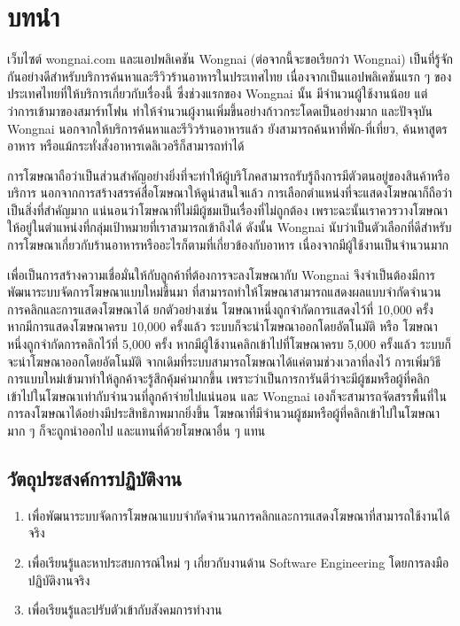 \chapter{บทนำ}
\label{chapter:introduction}

เว็บไซต์ wongnai.com และแอปพลิเคชัน Wongnai (ต่อจากนี้จะขอเรียกว่า Wongnai) เป็นที่รู้จักกันอย่างดีสำหรับบริการค้นหาและรีวิวร้านอาหารในประเทศไทย เนื่องจากเป็นแอปพลิเคชันแรก ๆ ของประเทศไทยที่ให้บริการเกี่ยวกับเรื่องนี้ ซึ่งช่วงแรกของ Wongnai นั้น มีจำนวนผู้ใช้งานน้อย แต่ว่าการเข้ามาของสมาร์ทโฟน ทำให้จำนวนผู้งานเพิ่มขึ้นอย่างก้าวกระโดดเป็นอย่างมาก และปัจจุบัน Wongnai นอกจากให้บริการค้นหาและรีวิวร้านอาหารแล้ว ยังสามารถค้นหาที่พัก-ที่เที่ยว, ค้นหาสูตรอาหาร หรือแม้กระทั่งสั่งอาหารเดลิเวอรีก็สามารถทำได้

การโฆษณาถือว่าเป็นส่วนสำคัญอย่างยิ่งที่จะทำให้ผู้บริโภคสามารถรับรู้ถึงการมีตัวตนอยู่ของสินค้าหรือบริการ นอกจากการสร้างสรรค์สื่อโฆษณาให้ดูน่าสนใจแล้ว การเลือกตำแหน่งที่จะแสดงโฆษณาก็ถือว่าเป็นสิ่งที่สำคัญมาก แน่นอนว่าโฆษณาที่ไม่มีผู้ชมเป็นเรื่องที่ไม่ถูกต้อง เพราะฉะนั้นเราควรวางโฆษณาให้อยู่ในตำแหน่งที่กลุ่มเป้าหมายที่เราสามารถเข้าถึงได้ ดังนั้น Wongnai นับว่าเป็นตัวเลือกที่ดีสำหรับการโฆษณาเกี่ยวกับร้านอาหารหรืออะไรก็ตามที่เกี่ยวข้องกับอาหาร เนื่องจากมีผู้ใช้งานเป็นจำนวนมาก

เพื่อเป็นการสร้างความเชื่อมั่นให้กับลูกค้าที่ต้องการจะลงโฆษณากับ Wongnai จึงจำเป็นต้องมีการพัฒนาระบบจัดการโฆษณาแบบใหม่ขึ้นมา ที่สามารถทำให้โฆษณาสามารถแสดงผลแบบจำกัดจำนวนการคลิกและการแสดงโฆษณาได้ ยกตัวอย่างเช่น โฆษณาหนึ่งถูกจำกัดการแสดงไว้ที่ 10,000 ครั้ง หากมีการแสดงโฆษณาครบ 10,000 ครั้งแล้ว ระบบก็จะนำโฆษณาออกโดยอัตโนมัติ หรือ โฆษณาหนึ่งถูกจำกัดการคลิกไว้ที่ 5,000 ครั้ง หากมีผู้ใช้งานคลิกเข้าไปที่โฆษณาครบ 5,000 ครั้งแล้ว ระบบก็จะนำโฆษณาออกโดยอัตโนมัติ จากเดิมที่ระบบสามารถโฆษณาได้แค่ตามช่วงเวลาที่ลงไว้ การเพิ่มวิธีการแบบใหม่เข้ามาทำให้ลูกค้าจะรู้สึกคุ้มค่ามากขึ้น เพราะว่าเป็นการการันตีว่าจะมีผู้ชมหรือผู้ที่คลิกเข้าไปในโฆษณาเท่ากับจำนวนที่ลูกค้าจ่ายไปแน่นอน และ Wongnai เองก็จะสามารถจัดสรรพื้นที่ในการลงโฆษณาได้อย่างมีประสิทธิภาพมากยิ่งขึ้น โฆษณาที่มีจำนวนผู้ชมหรือผู้ที่คลิกเข้าไปในโฆษณามาก ๆ ก็จะถูกนำออกไป และแทนที่ด้วยโฆษณาอื่น ๆ แทน

\section{วัตถุประสงค์การปฏิบัติงาน}
\begin{enumerate}
	\item เพื่อพัฒนาระบบจัดการโฆษณาแบบจำกัดจำนวนการคลิกและการแสดงโฆษณาที่สามารถใช้งานได้จริง
	\item เพื่อเรียนรู้และหาประสบการณ์ใหม่ ๆ เกี่ยวกับงานด้าน Software Engineering โดยการลงมือปฏิบัติงานจริง
	\item เพื่อเรียนรู้และปรับตัวเข้ากับสังคมการทำงาน
\end{enumerate}

